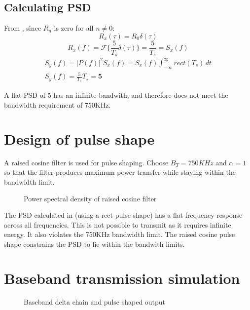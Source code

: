 \documentclass[11pt]{article}
\begin{document}
\subsection{Calculating PSD}
From , since $R_n$ is zero for all $n\neq 0$:
\begin{equation}
    R_x(\tau) = R_0 \delta(\tau)
\end{equation}
\begin{equation}
    R_x(f) = \mathcal{F}\{\frac{5}{T_s} \delta(\tau)\} = \frac{5}{T_s} = S_x(f)
\end{equation}
\begin{equation}
    \begin{gathered}
        S_y(f) = |P(f)|^2S_x(f) = S_x(f) \int_{-\infty}^{\infty} rect(T_s)
        \,dt\\
        S_y(f) = \frac{5}{T_s}T_s = \boldsymbol 5
    \end{gathered}
\end{equation}

A flat PSD of 5 has an infinite bandwith, and therefore does not meet the
bandwidth requirement of 750KHz.


\section{Design of pulse shape}\label{pulse_shape}
A raised cosine filter is used for pulse shaping. Choose $B_T = 750KHz$ and
$\alpha = 1$ so that the filter produces maximum power transfer while staying
within the bandwidth limit.
\begin{figure}[H]
    \centering
    \scalebox{0.7}{}
    \caption{Power spectral density of raised cosine filter\label{psdgraph}}
\end{figure}
The PSD calculated in  (using a rect pulse shape) has a
flat frequency response across all frequencies. This is not possible to transmit
as it requires infinite energy. It also violates the 750KHz bandwidth limit. The
raised cosine pulse shape constrains the PSD to lie within the bandwith limits.

\section{Baseband transmission simulation}
\begin{figure}[H]
    \centering
    \scalebox{0.7}{}
    \caption{Baseband delta chain and pulse shaped output\label{bbtxgraph}}
\end{figure}
\end{document}
